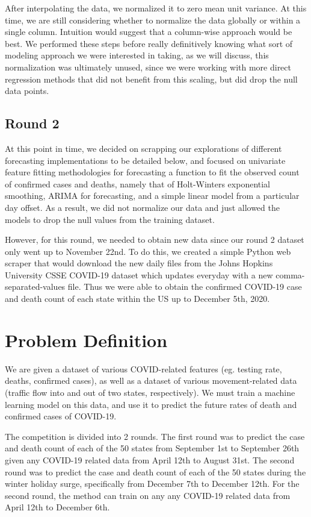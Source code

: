 \documentclass[sigconf,nonacm]{acmart}
\begin{document}
After interpolating the data, we normalized it to zero mean unit variance. At
this time, we are still considering whether to normalize the data globally or
within a single column. Intuition would suggest that a column-wise approach
would be best. We performed these steps before really definitively knowing what
sort of modeling approach we were interested in taking, as we will discuss,
this normalization was ultimately unused, since we were working with more
direct regression methods that did not benefit from this scaling, but did drop
the null data points.

\subsection{Round 2}
At this point in time, we decided on scrapping our explorations of different
forecasting implementations to be detailed below, and focused on univariate
feature fitting methodologies for forecasting a function to fit the observed
count of confirmed cases and deaths, namely that of Holt-Winters exponential
smoothing, ARIMA for forecasting, and a simple linear model from a particular
day offset. As a result, we did not normalize our data and just allowed the
models to drop the null values from the training dataset.

However, for this round, we needed to obtain new data since our round 2 dataset
only went up to November 22nd. To do this, we created a simple Python web scraper that 
would download the new daily files from the Johns Hopkins University CSSE COVID-19 
dataset \cite{JHUdataset} which updates everyday with a new comma-separated-values file.
Thus we were able to obtain the confirmed COVID-19 case and death count of each state
within the US up to December 5th, 2020.


\section{Problem Definition}
We are given a dataset of various COVID-related features (eg. testing rate,
deaths, confirmed cases), as well as a dataset of various movement-related data
(traffic flow into and out of two states, respectively). 
We must train a machine learning model on this data, and use it to predict the
future rates of death and confirmed cases of COVID-19. 

The competition is divided into 2 rounds. The first round was to predict the
case and death count of each of the 50 states from September 1st to September
26th given any COVID-19 related data from April 12th to August 31st. The second
round was to predict the case and death count of each of the 50 states during
the winter holiday surge, specifically from December 7th to December 12th. 
For
the second round, the method can train on any any COVID-19 related data from
April 12th to December 6th. 
\end{document}
